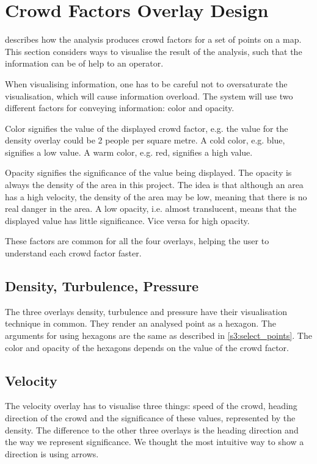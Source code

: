 \section{Crowd Factors Overlay Design} \label{sec:s4_overlay}

 describes how the analysis produces crowd factors for a set of points on a map. This section considers ways to visualise the result of the analysis, such that the information can be of help to an operator.

When visualising information, one has to be careful not to oversaturate the visualisation, which will cause information overload. The system will use two different factors for conveying information: color and opacity. 

Color signifies the value of the displayed crowd factor, e.g. the value for the density overlay could be 2 people per square metre. A cold color, e.g. blue, signifies a low value. A warm color, e.g. red, signifies a high value. 

Opacity signifies the significance of the value being displayed. The opacity is always the density of the area in this project. The idea is that although an area has a high velocity, the density of the area may be low, meaning that there is no real danger in the area. A low opacity, i.e. almost translucent, means that the displayed value has little significance. Vice versa for high opacity. 

These factors are common for all the four overlays, helping the user to understand each crowd factor faster.

\subsection{Density, Turbulence, Pressure}
The three overlays density, turbulence and pressure have their visualisation technique in common. They render an analysed point as a hexagon. The arguments for using hexagons are the same as described in \cref{s3:select_points}. The color and opacity of the hexagons depends on the value of the crowd factor.

\subsection{Velocity}
The velocity overlay has to visualise three things: speed of the crowd, heading direction of the crowd and the significance of these values, represented by the density. The difference to the other three overlays is the heading direction and the way we represent significance. We thought the most intuitive way to show a direction is using arrows. 

